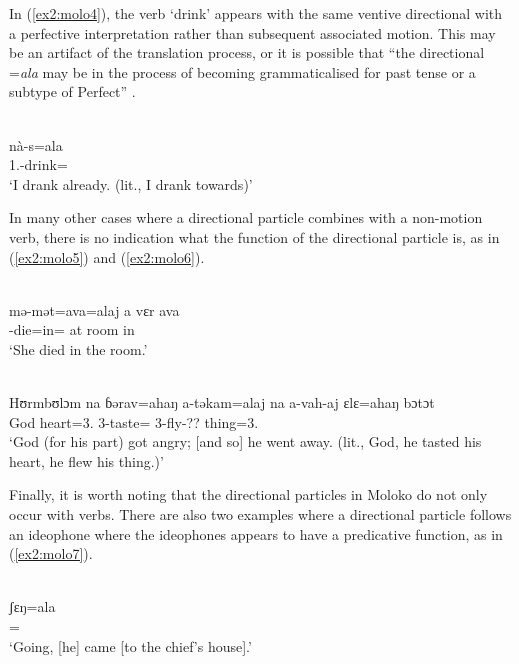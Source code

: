 In (\ref{ex2:molo4}), the verb `drink' appears with the same ventive directional with a perfective interpretation rather than subsequent associated motion. This may be an artifact of the translation process, or it is possible that “the directional =\textit{ala} may be in the process of becoming grammaticalised for past tense or a subtype of Perfect” \citep[243]{friesenGrammarMoloko2017}. 

\ea\label{ex2:molo4}
 \\
\gll nà-s=ala \\
1.-drink= \\
\glt `I drank already. (lit., I drank towards)'
\z 

In many other cases where a directional particle combines with a non-motion verb, there is no indication what the function of the directional particle is, as in (\ref{ex2:molo5}) and (\ref{ex2:molo6}).

\ea\label{ex2:molo5}
 \\
\gll mə-mət=ava=alaj	a	vɛr	ava \\
-die=in=	at	room	in \\
\glt `She died in the room.'

\ex\label{ex2:molo6}
 \\
\gll Hʊrmbʊlɔm na ɓərav=ahaŋ a-təkam=alaj na a-vah-aj ɛlɛ=ahaŋ bɔtɔt\\
God  heart=3. 3-taste=  3-fly-?? thing=3. 	\\
\glt `God (for his part) got angry; [and so] he went away. (lit., God, he tasted his heart, he flew his thing.)'
\z 

Finally, it is worth noting that the directional particles in Moloko do not only occur with verbs. There are also two examples where a directional particle follows an ideophone where the ideophones appears to have a predicative function, as in (\ref{ex2:molo7}).

\ea\label{ex2:molo7}
 \\
\gll ʃɛŋ=ala \\
= \\
\glt `Going, [he] came [to the chief’s house].'
\z 


